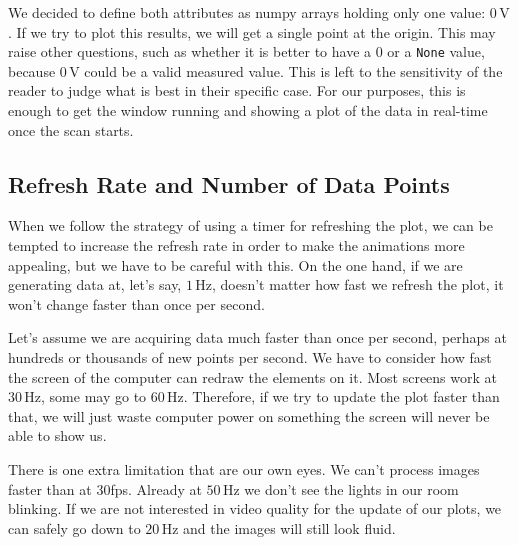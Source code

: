 We decided to define both attributes as numpy arrays holding only one value: $0\,\textrm{V}$. If we try to plot this results, we will get a single point at the origin. This may raise other questions, such as whether it is better to have a $0$ or a \texttt{None} value, because $0\,\textrm{V}$ could be a valid measured value. This is left to the sensitivity of the reader to judge what is best in their specific case. For our purposes, this is enough to get the window running and showing a plot of the data in real-time once the scan starts.


\subsection{Refresh Rate and Number of Data Points}\label{subsec:refresh-rate-and-number-of-data-points}
When we follow the strategy of using a timer for refreshing the plot, we can be tempted to increase the refresh rate in order to make the animations more appealing, but we have to be careful with this. On the one hand, if we are generating data at, let's say, $1\,\textrm{Hz}$, doesn't matter how fast we refresh the plot, it won't change faster than once per second.

Let's assume we are acquiring data much faster than once per second, perhaps at hundreds or thousands of new points per second. We have to consider how fast the screen of the computer can redraw the elements on it. Most screens work at $30\,\textrm{Hz}$, some may go to $60\,\textrm{Hz}$. Therefore, if we try to update the plot faster than that, we will just waste computer power on something the screen will never be able to show us.

There is one extra limitation that are our own eyes. We can't process images faster than at 30fps. Already at $50\,\textrm{Hz}$ we don't see the lights in our room blinking. If we are not interested in video quality for the update of our plots, we can safely go down to $20\,\textrm{Hz}$ and the images will still look fluid.


